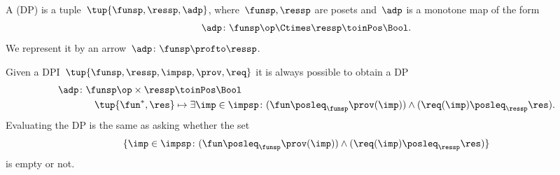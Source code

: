\begin{definition}
    \label{def:design-problem}
    A  (DP) is a tuple~$\tup{\funsp, \ressp, \adp}$, where~$\funsp, \ressp$ are posets and~$\adp$ is a monotone map of the form%
    \begin{equation*}
        \label{eq:design_prob_as_monfun}
        \adp \colon  \funsp\op \Ctimes \ressp \toinPos \Bool.
    \end{equation*}
    We represent it by an arrow~$\adp \colon \funsp \profto \ressp$.
\end{definition}

Given a DPI~$\tup{\funsp, \ressp, \impsp, \prov,\req}$ it is always possible to obtain a DP
\begin{equation}
    \label{eq:dpi_to_dp_1}
    \begin{aligned}
        \adp\colon \funsp\op \times \ressp &\toinPos \Bool\\
        \tup{\fun^*,\res}&\mapsto \exists \imp \in \impsp \colon (\fun \posleq_\funsp \prov(\imp)) \wedge (\req(\imp)\posleq_\ressp \res).
    \end{aligned}
\end{equation}
Evaluating the DP is the same as asking whether the set
\begin{equation}
    \label{eq:dpi_to_dp_2}
    \{ \imp \in \impsp \colon (\fun \posleq_\funsp \prov(\imp)) \wedge (\req(\imp)\posleq_\ressp \res)\}
\end{equation}
is empty or not.


